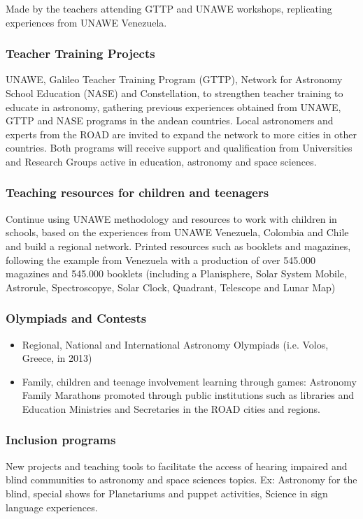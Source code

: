 \documentclass[12pt]{article}
\begin{document}
Made by the teachers attending GTTP and UNAWE workshops, replicating
experiences from UNAWE Venezuela.  

\subsubsection*{Teacher Training Projects}
UNAWE, Galileo Teacher Training Program (GTTP), Network for Astronomy
School Education (NASE) and Constellation, to strengthen teacher
training to educate in astronomy, gathering previous experiences
obtained from UNAWE, GTTP and NASE programs in the andean
countries. Local astronomers and experts from the ROAD are
invited to expand the network to more cities in other countries. Both
programs will receive support and qualification from Universities and
Research Groups active in education, astronomy and space sciences. 

\subsubsection*{Teaching resources for children and teenagers}
Continue using UNAWE methodology and resources to work with children
in schools, based on the experiences from  UNAWE Venezuela, Colombia
and Chile and build a regional network. Printed resources such as
booklets and magazines, following the example from Venezuela with a
production of over 545.000 magazines and 545.000 booklets (including a
Planisphere, Solar System Mobile, Astrorule, Spectroscopye, Solar
Clock, Quadrant, Telescope and Lunar Map) 

\subsubsection*{Olympiads and Contests}
\begin{itemize}
\item Regional, National and International Astronomy Olympiads
  (i.e. Volos, Greece, in 2013) 
\item Family, children and teenage involvement learning through games:
  Astronomy Family Marathons promoted through public institutions such
  as libraries and Education Ministries and Secretaries in the ROAD
  cities and regions.  
\end{itemize}

\subsubsection*{Inclusion programs}
New projects and teaching tools to facilitate the access of hearing
impaired and blind communities to astronomy and space sciences
topics. Ex: Astronomy for the blind, special shows for Planetariums
and puppet activities, Science in sign language experiences.   
\end{document}
